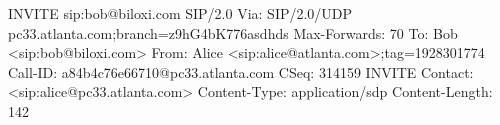 INVITE sip:bob@biloxi.com SIP/2.0
Via: SIP/2.0/UDP pc33.atlanta.com;branch=z9hG4bK776asdhds
Max-Forwards: 70
To: Bob <sip:bob@biloxi.com>
From: Alice <sip:alice@atlanta.com>;tag=1928301774
Call-ID: a84b4c76e66710@pc33.atlanta.com
CSeq: 314159 INVITE
Contact: <sip:alice@pc33.atlanta.com>
Content-Type: application/sdp
Content-Length: 142
